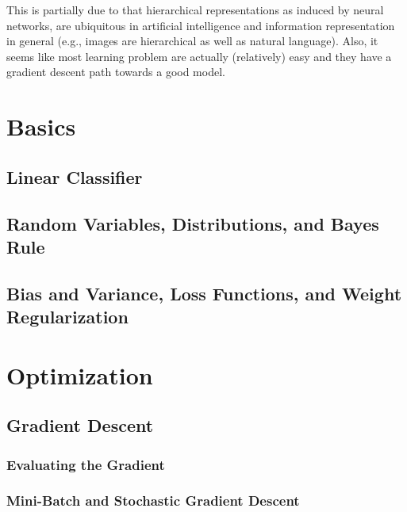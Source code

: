 		This is partially due to that hierarchical representations as induced by neural networks, are ubiquitous in artificial intelligence and information representation in general (e.g., images are hierarchical as well as natural language). Also, it seems like most learning problem are actually (relatively) easy and they have a gradient descent path towards a good model.

\chapter{Basics} %

	\section{Linear Classifier} %

	\section{Random Variables, Distributions, and Bayes Rule} %

	\section{Bias and Variance, Loss Functions, and Weight Regularization} %

\chapter{Optimization} %

	\section{Gradient Descent} %

		\subsection{Evaluating the Gradient} %

		\subsection{Mini-Batch and Stochastic Gradient Descent} %

